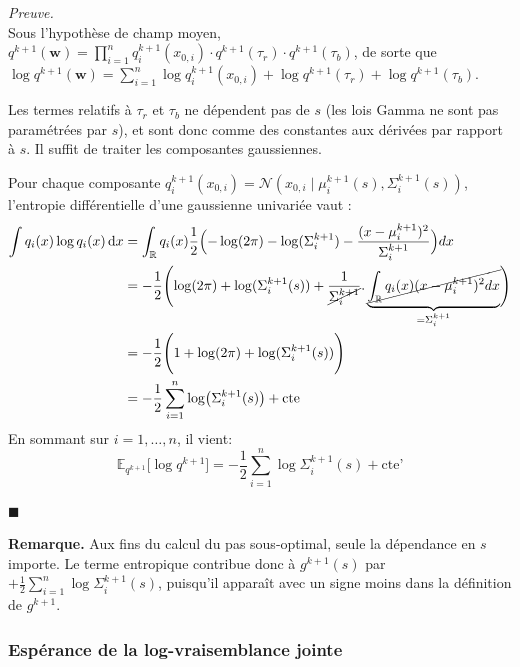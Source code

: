 \documentclass[12pt]{article}
\newcommand{\w}{\boldsymbol{w}}
\renewcommand{\qedsymbol}{$\blacksquare$}
\renewenvironment{proof}[1][\proofname]{%
  \par\medskip\noindent
  \textit{\color{proofgray}#1.}\enspace\ignorespaces
}{\hfill\qedsymbol\par\medskip}
\renewcommand{\proofname}{Preuve}
\begin{document}
\begin{proof}\\
Sous l'hypothèse de champ moyen, $q^{k+1}(\w) = \prod_{i=1}^n q_i^{k+1}(x_{0,i}) \cdot q^{k+1}(\tau_r) \cdot q^{k+1}(\tau_b)$, de sorte que $\log q^{k+1}(\w) = \sum_{i=1}^n \log q_i^{k+1}(x_{0,i}) + \log q^{k+1}(\tau_r) + \log q^{k+1}(\tau_b)$.

Les termes relatifs à $\tau_r$ et $\tau_b$ ne dépendent pas de $s$ (les lois Gamma ne sont pas paramétrées par $s$), et sont donc comme des constantes aux dérivées par rapport à $s$. Il suffit de traiter les composantes gaussiennes.

Pour chaque composante $q_i^{k+1}(x_{0,i}) = \mathcal{N}(x_{0,i} \mid \mu_i^{k+1}(s), \Sigma_i^{k+1}(s))$, l'entropie différentielle d'une gaussienne univariée vaut :
\begin{equation*}
\begin{aligned}
\int q_i(x) \log q_i(x)\, \mathrm{d}x &= \int_{\mathbb{R}} q_i(x)\frac12\Bigl(-\log(2 \pi ) -\log(\Sigma_i^{k+1}) - \frac{(x - \mu_i^{k+1})^2}{\Sigma_i^{k+1}}\Bigr) dx\\
&=-\frac{1}{2}\Biggl(\log(2\pi) + \log(\Sigma_i^{k+1}(s)) + \frac{1}{\cancel{\Sigma_i^{k+1}}}.\underbrace{\cancel{\int_{\mathbb{R}} q_i(x)(x-\mu_i^{k+1})^2 dx}}_{= \Sigma_i^{k+1}}\Biggr)\\
&= -\frac12 \Biggl( 1 + \log(2 \pi) + \log(\Sigma_i^{k+1}(s)) \Biggr)\\
&=- \frac12 \sum_{i=1}^n \log\bigl( \Sigma_i^{k+1}(s)\bigr) + \text{cte}
\end{aligned}
\end{equation*}
En sommant sur $i = 1, \ldots, n$, il vient:
\[
\mathbb{E}_{q^{k+1}}\bigl[\log q^{k+1}\bigr] = - \frac{1}{2}\sum_{i=1}^n \log \Sigma_i^{k+1}(s) + \text{cte'}
\]

\end{proof}

\noindent\textbf{Remarque.} Aux fins du calcul du pas sous-optimal, seule la dépendance en $s$ importe. Le terme entropique contribue donc à $g^{k+1}(s)$ par $+\frac{1}{2}\sum_{i=1}^n \log \Sigma_i^{k+1}(s)$, puisqu'il apparaît avec un signe moins dans la définition de $g^{k+1}$.



\subsubsection*{Espérance de la log-vraisemblance jointe}
\end{document}
